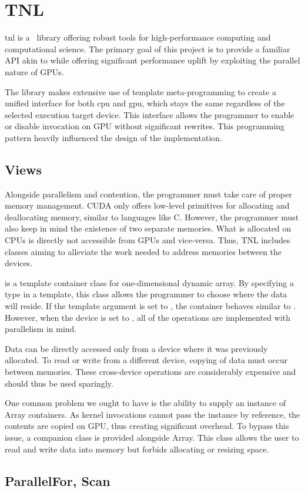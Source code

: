 \section{TNL}

\acrfull{tnl} \cite{tnl} is a \CC\ library offering robust tools for high-performance computing and computational science. The primary goal of this project is to provide a familiar API akin to  while offering significant performance uplift by exploiting the parallel nature of GPUs.

The library makes extensive use of template meta-programming to create a unified interface for both \acrshort{cpu} and \acrshort{gpu}, which stays the same regardless of the selected execution target device. This interface allows the programmer to enable or disable invocation on GPU without significant rewrites. This programming pattern heavily influenced the design of the implementation.

\subsection{Views}


Alongside parallelism and contention, the programmer must take care of proper memory management. CUDA only offers low-level primitives for allocating and deallocating memory, similar to languages like C. However, the programmer must also keep in mind the existence of two separate memories. What is allocated on CPUs is directly not accessible from GPUs and vice-versa. Thus, TNL includes classes aiming to alleviate the work needed to address memories between the devices.

 is a template container class for one-dimensional dynamic array. By specifying a type in a template, this class allows the programmer to choose where the data will reside. If the template argument is set to , the container behaves similar to . However, when the device is set to , all of the operations are implemented with parallelism in mind.

Data can be directly accessed only from a device where it was previously allocated. To read or write from a different device, copying of data must occur between memories. These cross-device operations are considerably expensive and should thus be used sparingly.

One common problem we ought to have is the ability to supply an instance of Array containers. As kernel invocations cannot pass the instance by reference, the contents are copied on GPU, thus creating significant overhead. To bypass this issue, a companion class  is provided alongside Array. This class allows the user to read and write data into memory but forbids allocating or resizing space.

\subsection{ParallelFor, Scan}

